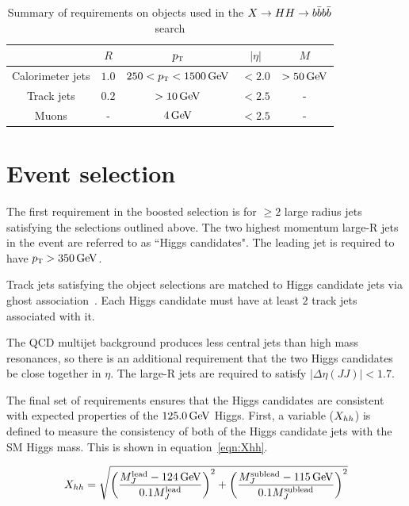 \begin{table}[h!]
\centering
\captionsetup{justification=centering}

\hspace{-10pt}
\begin{tabular}{|c|c|c|c|c|}
\hline
& $R$ & $p_{\textrm{\footnotesize\sc t}} $ & $|\eta|$ & $M$ \\ \hline
Calorimeter jets & $1.0$ & $250 < \pT < 1500 \GeV$ & $ < 2.0$ & $ > 50 \GeV$ \\ \hline
Track jets & $0.2$ & $> 10 \GeV$ & $< 2.5$ & - \\ \hline
Muons & - & $4 \GeV$ & $< 2.5$ & - \\ \hline
\end{tabular}

\caption{
Summary of requirements on objects used in the $X\to HH \to b\bar{b}b\bar{b}$ search
}
\label{tab:4b_req}
\end{table}

\section{Event selection}

The first requirement in the boosted selection is for $\geq 2$ large radius jets satisfying the selections outlined above. The two highest momentum large-R jets in the event are referred to as ``Higgs candidates". The leading jet is required to have $\pT > 350 \GeV$. 

Track jets satisfying the object selections are matched to Higgs candidate jets via ghost association~\cite{GhostAssociation}. Each Higgs candidate must have at least $2$ track jets associated with it.

The QCD multijet background produces less central jets than high mass resonances, so there is an additional requirement that the two Higgs candidates be close together in $\eta$. The large-R jets are required to satisfy $|\Delta\eta(JJ)| < 1.7$. 

The final set of requirements ensures that the Higgs candidates are consistent with expected properties of the $125.0 \GeV$ Higgs. First, a variable ($X_{hh}$) is defined to measure the consistency of both of the Higgs candidate jets with the SM Higgs mass. This is shown in equation~\ref{eqn:Xhh}. 

\begin{equation}
\label{eqn:Xhh}
\Xhh = \sqrt{\left(\frac{M_J^{\rm lead} - 124 \GeV}{0.1 M_J^{\rm lead}}\right)^2 + \left(\frac{M_J^{\rm sublead} - 115 \GeV}{0.1 M_J^{\rm sublead}}\right)^2}
\end{equation}

